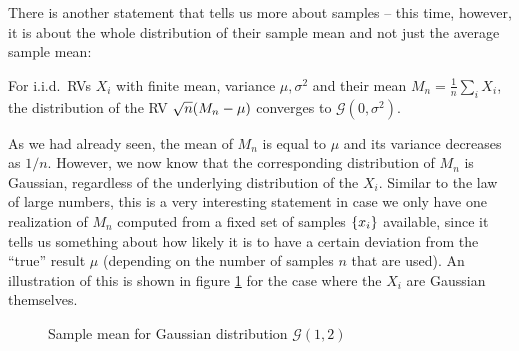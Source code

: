 There is another statement that tells us more about samples -- this time, however, it is about the whole distribution of their sample mean and not just the average sample mean:
\begin{prop}
For i.i.d.~RVs $X_i$ with finite mean, variance $\mu, \sigma^2$ and their mean $M_n = \frac{1}{n} \sum_i X_i$, the distribution of the RV $\sqrt{n} \qty(M_n - \mu)$ converges to $\mathcal{G}(0, \sigma^2)$.\footnotemark
\end{prop}
As we had already seen, the mean of $M_n$ is equal to $\mu$ and its variance decreases as $1 / n$. However, we now know that the corresponding distribution of $M_n$ is Gaussian, regardless of the underlying distribution of the $X_i$. Similar to the law of large numbers, this is a very interesting statement in case we only have one realization of $M_n$ computed from a fixed set of samples $\qty{x_i}$ available, since it tells us something about how likely it is to have a certain deviation from the \enquote{true} result $\mu$ (depending on the number of samples $n$ that are used). An illustration of this is shown in figure \ref{fig:central_limit} for the case where the $X_i$ are Gaussian themselves.




\begin{figure}
\centering

%
\hspace{0.04\textwidth}%
%

\caption{Sample mean for Gaussian distribution $\mathcal{G}(1, 2)$}
\label{fig:central_limit}
\end{figure}




